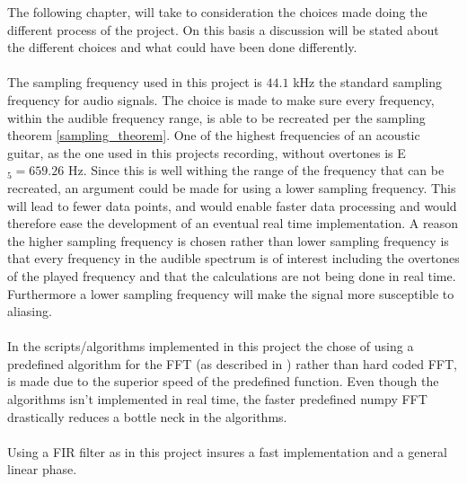 The following chapter, will take to consideration the choices made doing the different process of the project.
On this basis a discussion will be stated about the different choices and what could have been done differently.
\\\\
The sampling frequency used in this project is $44.1$ kHz the standard sampling frequency for audio signals.
The choice is made to make sure every frequency, within the audible frequency range, is able to be recreated per the sampling theorem \ref{sampling_theorem}.
One of the highest frequencies of an acoustic guitar, as the one used in this projects recording, without overtones is E$_5 = 659.26$ Hz. Since this is well withing the range of the frequency that can be recreated, an argument could be made for using a lower sampling frequency.
This will lead to fewer data points, and would enable faster data processing and would therefore ease the development of an eventual real time implementation. A reason the higher sampling frequency is chosen rather than lower sampling frequency is that every frequency in the audible spectrum is of interest including the overtones of the played frequency and that the calculations are not being done in real time.
Furthermore a lower sampling frequency will make the signal more susceptible to aliasing. %
\\\\
In the scripts/algorithms implemented in this project the chose of using a predefined algorithm for the FFT (as described in ) rather than hard coded FFT, is made due to the superior speed of the predefined function. 
Even though the algorithms isn't implemented in real time, the faster predefined numpy FFT drastically reduces a bottle neck in the algorithms.
\\\\
Using a FIR filter as in this project insures a fast implementation and a general linear phase.
